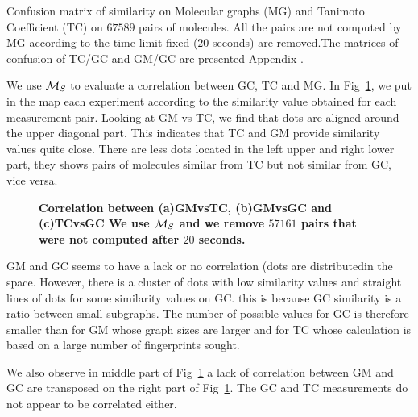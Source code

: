 \documentclass[10pt,letterpaper]{article}
\begin{document}
\begin{table}[!ht]
\begin{flushleft} Confusion matrix of similarity on Molecular graphs (MG) and Tanimoto Coefficient (TC) on $67589$ pairs of molecules. All the pairs are not computed by MG according to the time limit fixed ($20$ seconds) are removed.The matrices of confusion of TC/GC and GM/GC are presented Appendix . %

\end{flushleft}

\label{table3}


\end{table}
We use ${\cal M}_S$ to evaluate a correlation between GC, TC and MG. In Fig~\ref{newfig}, we put in the map each experiment according to the similarity value obtained for each measurement pair. Looking at GM vs TC, we find that dots are aligned around the upper diagonal part. This indicates that TC and GM provide similarity values ​​quite close. There are less dots located in the left upper and right lower part, they shows pairs of molecules similar from TC but not similar from GC, vice versa.


\begin{figure}[!h]
	\caption{\bf{Correlation between (a)GMvsTC, (b)GMvsGC and (c)TCvsGC} 
We use ${\cal M}_S$ and we remove $57161$ pairs that were not computed after $20$ seconds.}
	\label{newfig}
\end{figure}

GM and GC seems to have a lack or no correlation (dots are distributedin the space. However, there is a cluster of dots with low similarity values and straight lines of dots for some similarity values on GC. this is because GC similarity is a ratio between small subgraphs. The number of possible values for GC ​​is therefore smaller than for GM whose graph sizes are larger and for TC whose calculation is based on a large number of fingerprints sought. 

We also observe in middle part of Fig~\ref{newfig} a lack of correlation between GM and GC are transposed on the right part of Fig~\ref{newfig}. The GC and TC measurements do not appear to be correlated either.
\end{document}
